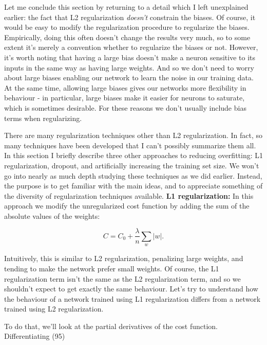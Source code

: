 Let me conclude this section by returning to a detail which I left unexplained earlier: the fact that L2 regularization \emph{doesn't} constrain the biases. Of course, it would be easy to modify the regularization procedure to regularize the biases. Empirically, doing this often doesn't change the results very much, so to some extent it's merely a convention whether to regularize the biases or not. However, it's worth noting that having a large bias doesn't make a neuron sensitive to its inputs in the same way as having large weights. And so we don't need to worry about large biases enabling our network to learn the noise in our training data. At the same time, allowing large biases gives our networks more flexibility in behaviour - in particular, large biases make it easier for neurons to saturate, which is sometimes desirable. For these reasons we don't usually include bias terms when regularizing.





There are many regularization techniques other than L2 regularization. In fact, so many techniques have been developed that I can't possibly summarize them all. In this section I briefly describe three other approaches to reducing overfitting: L1 regularization, dropout, and artificially increasing the training set size. We won't go into nearly as much depth studying these techniques as we did earlier. Instead, the purpose is to get familiar with the main ideas, and to appreciate something of the diversity of regularization techniques available. \textbf{L1 regularization:} In this approach we modify the unregularized cost function by adding the sum of the absolute values of the weights:

\begin{equation}
C = C_0 + \frac{\lambda}{n} \sum_w |w|.
\tag{95}
\end{equation}

\noindent Intuitively, this is similar to L2 regularization, penalizing large weights, and tending to make the network prefer small weights. Of course, the L1 regularization term isn't the same as the L2 regularization term, and so we shouldn't expect to get exactly the same behaviour. Let's try to understand how the behaviour of a network trained using L1 regularization differs from a network trained using L2 regularization.


To do that, we'll look at the partial derivatives of the cost function. Differentiating (95)

